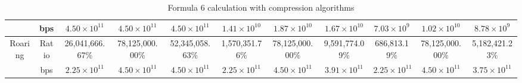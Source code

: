 \begin{table}[h]
{\begin{tabular}{|c|c|c|c|c|c|c|c|c|c|c|}
\cline{2-11}
& bps & $4.50 \times 10^{11}$ & $4.50 \times 10^{11}$ & $4.50 \times 10^{11}$ & $1.41 \times 10^{10}$ & $1.87 \times 10^{10}$ & $1.67 \times 10^{10}$ & $7.03 \times 10^{9}$ & $1.02 \times 10^{10}$ & $8.78 \times 10^{9}$ \\
\hline
\multirow{2}{*}{Roaring} & Ratio & 26,041,666.67\% & 78,125,000.00\% & 52,345,058.63\% & 1,570,351.76\% & 78,125,000.00\% & 9,591,774.09\% & 686,813.19\% & 78,125,000.00\% & 5,182,421.23\% \\
\cline{2-11}
& bps & $2.25 \times 10^{11}$ & $4.50 \times 10^{11}$ & $4.50 \times 10^{11}$ & $2.25 \times 10^{11}$ & $4.50 \times 10^{11}$ & $3.91 \times 10^{11}$ & $2.25 \times 10^{11}$ & $4.50 \times 10^{11}$ & $3.75 \times 10^{11}$ \\
\hline
\end{tabular}
}
\caption{Formula 6 calculation with compression algorithms}
\label{tbl:formulacompress6}
\end{table}



